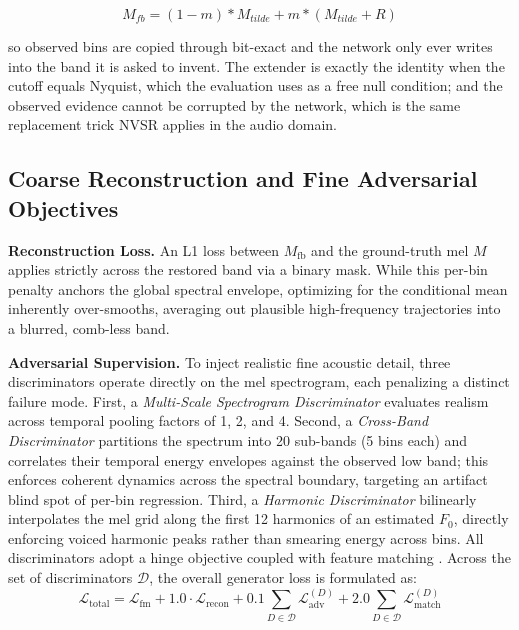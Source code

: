 \documentclass{article}
\begin{document}
$$ M_{fb} = (1 - m) * M_{tilde} + m * (M_{tilde} + R) $$

so observed bins are copied through bit-exact and the network only ever writes into the band it is asked to invent. The extender is exactly the identity when the cutoff equals Nyquist, which the evaluation uses as a free null condition; and the observed evidence cannot be corrupted by the network, which is the same replacement trick NVSR \cite{nvsr} applies in the audio domain.

\subsection{Coarse Reconstruction and Fine Adversarial Objectives}

\textbf{Reconstruction Loss.} An L1 loss between $M_{\text{fb}}$ and the ground-truth mel $M$ applies strictly across the restored band via a binary mask. While this per-bin penalty anchors the global spectral envelope, optimizing for the conditional mean inherently over-smooths, averaging out plausible high-frequency trajectories into a blurred, comb-less band.

\textbf{Adversarial Supervision.} To inject realistic fine acoustic detail, three discriminators operate directly on the mel spectrogram, each penalizing a distinct failure mode. First, a \textit{Multi-Scale Spectrogram Discriminator} evaluates realism across temporal pooling factors of 1, 2, and 4. Second, a \textit{Cross-Band Discriminator} partitions the spectrum into 20 sub-bands (5 bins each) and correlates their temporal energy envelopes against the observed low band; this enforces coherent dynamics across the spectral boundary, targeting an artifact blind spot of per-bin regression. Third, a \textit{Harmonic Discriminator} bilinearly interpolates the mel grid along the first 12 harmonics of an estimated $F_0$, directly enforcing voiced harmonic peaks rather than smearing energy across bins. All discriminators adopt a hinge objective coupled with feature matching \cite{hifigan}. Across the set of discriminators $\mathcal{D}$, the overall generator loss is formulated as:
\begin{equation}
\mathcal{L}_{\text{total}} = \mathcal{L}_{\text{fm}} + 1.0 \cdot \mathcal{L}_{\text{recon}} + 0.1 \sum_{D \in \mathcal{D}} \mathcal{L}_{\text{adv}}^{(D)} + 2.0 \sum_{D \in \mathcal{D}} \mathcal{L}_{\text{match}}^{(D)}
\end{equation}
\end{document}
